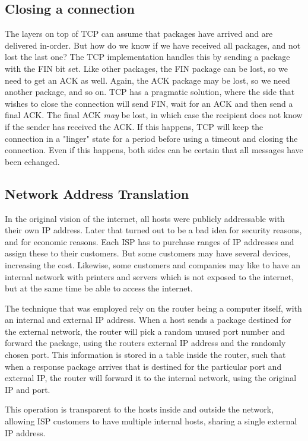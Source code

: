 \subsection{Closing a connection}
The layers on top of TCP can assume that packages have arrived and are delivered in-order. But how do we know if we have received all packages, and not lost the last one? The TCP implementation handles this by sending a package with the FIN bit set. Like other packages, the FIN package can be lost, so we need to get an ACK as well. Again, the ACK package may be lost, so we need another package, and so on. TCP has a pragmatic solution, where the side that wishes to close the connection will send FIN, wait for an ACK and then send a final ACK. The final ACK \emph{may} be lost, in which case the recipient does not know if the sender has received the ACK. If this happens, TCP will keep the connection in a "linger" state for a period before using a timeout and closing the connection. Even if this happens, both sides can be certain that all messages have been echanged.

\subsection{Network Address Translation}
In the original vision of the internet, all hosts were publicly addressable with their own IP address. Later that turned out to be a bad idea for security reasons, and for economic reasons. Each ISP has to purchase ranges of IP addresses and assign these to their customers. But some customers may have several devices, increasing the cost. Likewise, some customers and companies may like to have an internal network with printers and servers which is not exposed to the internet, but at the same time be able to access the internet.

The technique that was employed rely on the router being a computer itself, with an internal and external IP address. When a host sends a package destined for the external network, the router will pick a random unused port number and forward the package, using the routers external IP address and the randomly chosen port. This information is stored in a table inside the router, such that when a response package arrives that is destined for the particular port and external IP, the router will forward it to the internal network, using the original IP and port. 

This operation is transparent to the hosts inside and outside the network, allowing ISP customers to have multiple internal hosts, sharing a single external IP address. 

